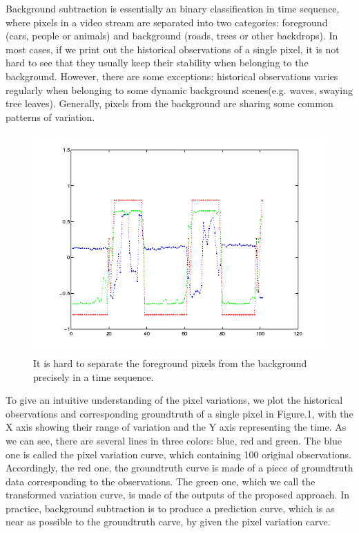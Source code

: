 \documentclass[runningheads,a4paper]{llncs}
\begin{document}
Background subtraction is essentially an binary classification in time sequence, where pixels in a video stream are separated into two categories: foreground (cars, people or animals) and background (roads, trees or other backdrops). In most cases, if we print out the historical observations of a single pixel, it is not hard to see that they usually keep their stability when belonging to the background. However, there are some exceptions: historical observations varies regularly when belonging to some dynamic background scenes(e.g. waves, swaying tree leaves). Generally, pixels from the background are sharing some common patterns of variation. 
\begin{figure}
    \centering
    \includegraphics[width=\textwidth]{figure/fig1}
    \caption{It is hard to separate the foreground pixels from the background precisely in a time sequence.}
    \label{variation_chart}
\end{figure}
To give an intuitive understanding of the pixel variations, we plot the historical observations and corresponding groundtruth of a single pixel in Figure.1, with the X axis showing their range of variation and the Y axis representing the time. As we can see, there are several lines in three colors: blue, red and green. The blue one is called the pixel variation curve, which containing 100 original observations. Accordingly, the red one, the groundtruth curve is made of a piece of groundtruth data corresponding to the observations. The green one, which we call the transformed variation curve, is made of the outputs of the proposed approach. In practice, background subtraction is to produce a prediction curve, which is as near as possible to the groundtruth carve, by given the pixel variation carve. 
\end{document}
